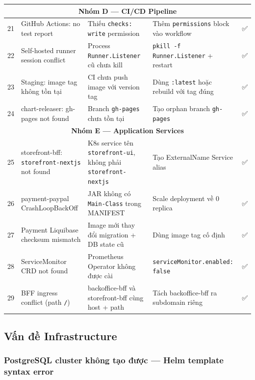 \begin{center}
\begin{longtable}{|c|p{3cm}|p{3.8cm}|p{3.8cm}|c|}
\hline
\multicolumn{5}{|c|}{\textbf{Nhóm D — CI/CD Pipeline}} \\
\hline
21 & GitHub Actions: no test report & Thiếu \texttt{checks: write} permission & Thêm \texttt{permissions} block vào workflow & ✅ \\
\hline
22 & Self-hosted runner session conflict & Process \texttt{Runner.Listener} cũ chưa kill & \texttt{pkill -f Runner.Listener} + restart & ✅ \\
\hline
23 & Staging: image tag không tồn tại & CI chưa push image với version tag & Dùng \texttt{:latest} hoặc rebuild với tag đúng & ✅ \\
\hline
24 & chart-releaser: gh-pages not found & Branch \texttt{gh-pages} chưa tồn tại & Tạo orphan branch \texttt{gh-pages} & ✅ \\
\hline
\multicolumn{5}{|c|}{\textbf{Nhóm E — Application Services}} \\
\hline
25 & storefront-bff: \texttt{storefront-nextjs} not found & K8s service tên \texttt{storefront-ui}, không phải \texttt{storefront-nextjs} & Tạo ExternalName Service alias & ✅ \\
\hline
26 & payment-paypal CrashLoopBackOff & JAR không có \texttt{Main-Class} trong MANIFEST & Scale deployment về 0 replica & ✅ \\
\hline
27 & Payment Liquibase checksum mismatch & Image mới thay đổi migration + DB state cũ & Dùng image tag cố định & ✅ \\
\hline
28 & ServiceMonitor CRD not found & Prometheus Operator không được cài & \texttt{serviceMonitor.enabled: false} & ✅ \\
\hline
29 & BFF ingress conflict (path \texttt{/}) & backoffice-bff và storefront-bff cùng host + path & Tách backoffice-bff ra subdomain riêng & ✅ \\
\hline
\end{longtable}
\end{center}

\subsection{Vấn đề Infrastructure}

\subsubsection{PostgreSQL cluster không tạo được — Helm template syntax error}

